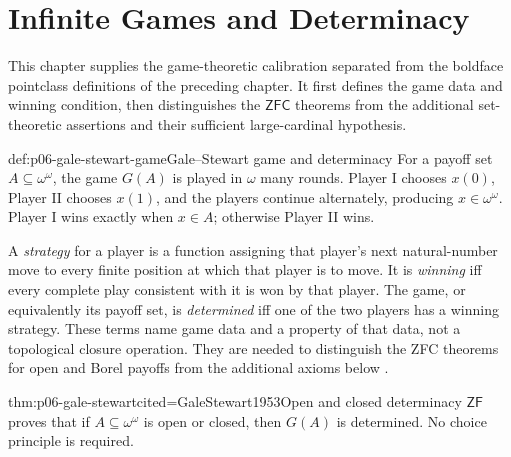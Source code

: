 
\chapter{Infinite Games and Determinacy}
\label{sec:p06-determinacy}

This chapter supplies the game-theoretic calibration separated from the
boldface pointclass definitions of the preceding chapter.  It first defines
the game data and winning condition, then distinguishes the
\(\mathsf{ZFC}\) theorems from the additional set-theoretic assertions and
their sufficient large-cardinal hypothesis.

\begin{hbdefinition}{def:p06-gale-stewart-game}{Gale--Stewart game and determinacy}
For a payoff set \(A\subseteq\omega^\omega\), the game \(G(A)\) is played in
\(\omega\) many rounds.  Player I chooses \(x(0)\), Player II chooses \(x(1)\),
and the players continue alternately, producing
\(x\in\omega^\omega\).  Player I wins exactly when \(x\in A\); otherwise
Player II wins.

A \emph{strategy} for a player is a function assigning that player's next
natural-number move to every finite position at which that player is to move.
It is \emph{winning} iff every complete play consistent with it is won by that
player.  The game, or equivalently its payoff set, is \emph{determined} iff one
of the two players has a winning strategy.  These terms name game data and a
property of that data, not a topological closure operation.  They are needed
to distinguish the ZFC theorems for open and Borel payoffs from the additional
axioms below \cite{GaleStewart1953}.
\end{hbdefinition}

\begin{hbtheorem}{thm:p06-gale-stewart}{cited=GaleStewart1953}{Open and closed determinacy}
\(\mathsf{ZF}\) proves that if \(A\subseteq\omega^\omega\) is open or
closed, then \(G(A)\) is determined.  No choice principle is required.
\end{hbtheorem}

